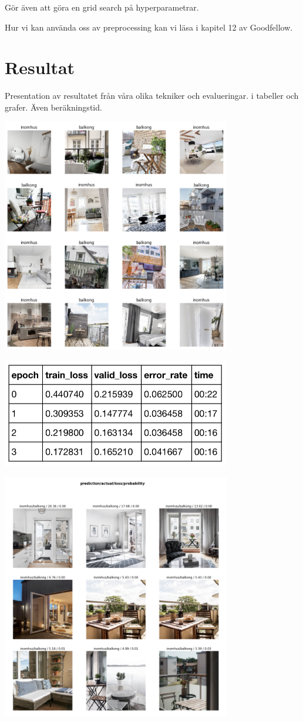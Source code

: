 \documentclass{kththesis}
\begin{document}
Gör även att göra en grid search på hyperparametrar.

Hur vi kan använda oss av preprocessing kan vi  läsa i kapitel 12 av Goodfellow.

\chapter{Resultat}
Presentation av resultatet från våra olika tekniker och evalueringar. i tabeller och grafer. Även beräkningstid. 

\includegraphics[width=10cm]{../images/1.png}

\includegraphics[width=10cm]{../images/2.png}

\includegraphics[width=10cm]{../images/3.png}
\end{document}
